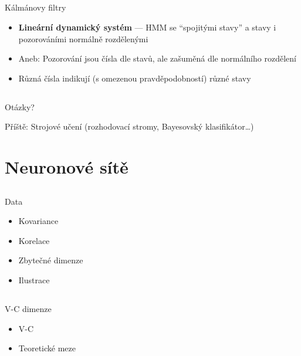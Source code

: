 \documentclass{beamer}
\begin{document}
\subsection{}
\begin{frame}{Kálmánovy filtry}
\begin{itemize}
\item {\bf Lineární dynamický systém} --- HMM se ``spojitými stavy'' a stavy i pozorováními normálně rozdělenými
\item Aneb: Pozorování jsou čísla dle stavů, ale zašuměná dle normálního rozdělení
\item Různá čísla indikují (s omezenou pravděpodobností) různé stavy
\end{itemize}
\end{frame}

\subsection{}
\begin{frame}{Otázky?}
\begin{center}
Příště: Strojové učení (rozhodovací stromy, Bayesovský klasifikátor\dots)
\end{center}
\end{frame}

\section{Neuronové sítě}

\subsection{}
\begin{frame}{Data}
\begin{itemize}
\item Kovariance
\item Korelace
\item Zbytečné dimenze
\item Ilustrace
\end{itemize}
\end{frame}

\subsection{}
\begin{frame}{V-C dimenze}
\begin{itemize}
\item V-C
\item Teoretické meze
\end{itemize}
\end{frame}
\end{document}
